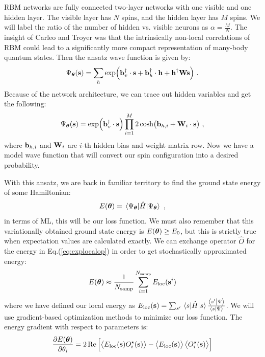 RBM networks are fully connected two-layer networks with one visible and one hidden layer. The visible layer has $N$ spins, and the hidden layer has $M$ spins. We will label the ratio of the number of hidden vs. visible neurons as $\alpha = \frac{M}{N}$. The insight of Carleo and Troyer was that the intrinsically non-local correlations of RBM could lead to a significantly more compact representation of many-body quantum states. Then the ansatz wave function is given by:
\begin{equation}
	\Psi_{\boldsymbol{\theta}}(\vb{s}) = \sum_h \exp(\vb{b}_v^\dagger \cdot \vb{s} + \vb{b}_h^\dagger \cdot \vb{h} + \vb{h}^\dagger  \vb{W} \vb{s} ) \ .
\end{equation}
Because of the network architecture, we can trace out hidden variables and get the following:
\begin{equation}
	\Psi_{\boldsymbol{\theta}}(\vb{s}) = \exp(\vb{b}_v^\dagger \cdot \vb{s}) \prod_{i=1}^{M}2\cosh(\vb{b}_{h,i} + \vb{W}_i \cdot \vb{s}) \ ,
\end{equation}
where  $\vb{b}_{h,i}$ and $\vb{W}_i$ are $i$-th hidden bias and weight matrix row. Now we have a model wave function that will convert our spin configuration into a desired probability.
\par
With this ansatz, we are back in familiar territory to find the ground state energy of some Hamiltonian:
\begin{equation}
	E(\vbtheta) = \ev{\hat{H}}{\Psi_{\vbtheta}} \mathcomma
\end{equation}
in terms of ML, this will be our loss function. We must also remember that this variationally obtained ground state energy is $E(\boldsymbol{\theta}) \geq E_0$, but this is strictly true when expectation values are calculated exactly.
\newline
We can exchange operator $\hat{O}$ for the energy in Eq.(\ref{eq:explocalop}) in order to get stochastically approximated energy:
\begin{equation}
	E(\boldsymbol{\theta}) \approx \frac{1}{N_{\text{samp}}} \sum_{i=1}^{N_{\text{samp}}} E_{\text{loc}}(\vb{s}^i)
\end{equation}
where we have defined our local energy as $E_{\text{loc}}(\vb{s}) = \sum_{s'}\ev{\hat{H}}{s}\frac{\braket{s'}{\Psi}}{\braket{s}{\Psi}}$. We will use gradient-based optimization methods to minimize our loss function. The energy gradient with respect to parameters is:
\begin{equation}
	\pdv{E(\boldsymbol{\theta})}{\theta_i} = 2\Re \left[\expval{E_{\text{loc}}(\vb{s}) O_i^\star (\vb{s})} - \expval{E_{\text{loc}}(\vb{s})}\expval{O_i^\star (\vb{s})}\right]
	\label{eq:rbmDeriv}
\end{equation}
